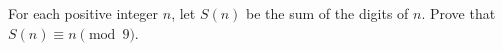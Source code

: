For each positive integer $n$, let $S(n)$ be the sum of the digits of $n$. Prove that $S(n)\equiv n\pmod9$.
